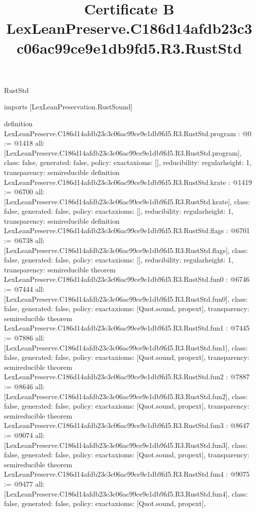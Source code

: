 \begin{lexlean}{RustStd}
\title{Certificate B LexLeanPreserve.C186d14afdb23c3c06ac99ce9e1db9fd5.R3.RustStd}
\begin{coremodule}
imports [LexLeanPreservation.RustSound]

definition LexLeanPreserve.C186d14afdb23c3c06ac99ce9e1db9fd5.R3.RustStd.program : @0 := @1418 {
  all: [LexLeanPreserve.C186d14afdb23c3c06ac99ce9e1db9fd5.R3.RustStd.program],
  class: false,
  generated: false,
  policy: exact{axioms: []},
  reducibility: regular{height: 1},
  transparency: semireducible
}
definition LexLeanPreserve.C186d14afdb23c3c06ac99ce9e1db9fd5.R3.RustStd.krate : @1419 := @6700 {
  all: [LexLeanPreserve.C186d14afdb23c3c06ac99ce9e1db9fd5.R3.RustStd.krate],
  class: false,
  generated: false,
  policy: exact{axioms: []},
  reducibility: regular{height: 1},
  transparency: semireducible
}
definition LexLeanPreserve.C186d14afdb23c3c06ac99ce9e1db9fd5.R3.RustStd.flags : @6701 := @6738 {
  all: [LexLeanPreserve.C186d14afdb23c3c06ac99ce9e1db9fd5.R3.RustStd.flags],
  class: false,
  generated: false,
  policy: exact{axioms: []},
  reducibility: regular{height: 1},
  transparency: semireducible
}
theorem LexLeanPreserve.C186d14afdb23c3c06ac99ce9e1db9fd5.R3.RustStd.fun0 : @6746 := @7444 {
  all: [LexLeanPreserve.C186d14afdb23c3c06ac99ce9e1db9fd5.R3.RustStd.fun0],
  class: false,
  generated: false,
  policy: exact{axioms: [Quot.sound, propext]},
  transparency: semireducible
}
theorem LexLeanPreserve.C186d14afdb23c3c06ac99ce9e1db9fd5.R3.RustStd.fun1 : @7445 := @7886 {
  all: [LexLeanPreserve.C186d14afdb23c3c06ac99ce9e1db9fd5.R3.RustStd.fun1],
  class: false,
  generated: false,
  policy: exact{axioms: [Quot.sound, propext]},
  transparency: semireducible
}
theorem LexLeanPreserve.C186d14afdb23c3c06ac99ce9e1db9fd5.R3.RustStd.fun2 : @7887 := @8646 {
  all: [LexLeanPreserve.C186d14afdb23c3c06ac99ce9e1db9fd5.R3.RustStd.fun2],
  class: false,
  generated: false,
  policy: exact{axioms: [Quot.sound, propext]},
  transparency: semireducible
}
theorem LexLeanPreserve.C186d14afdb23c3c06ac99ce9e1db9fd5.R3.RustStd.fun3 : @8647 := @9074 {
  all: [LexLeanPreserve.C186d14afdb23c3c06ac99ce9e1db9fd5.R3.RustStd.fun3],
  class: false,
  generated: false,
  policy: exact{axioms: [Quot.sound, propext]},
  transparency: semireducible
}
theorem LexLeanPreserve.C186d14afdb23c3c06ac99ce9e1db9fd5.R3.RustStd.fun4 : @9075 := @9477 {
  all: [LexLeanPreserve.C186d14afdb23c3c06ac99ce9e1db9fd5.R3.RustStd.fun4],
  class: false,
  generated: false,
  policy: exact{axioms: [Quot.sound, propext]},
}
\end{coremodule}
\end{lexlean}
